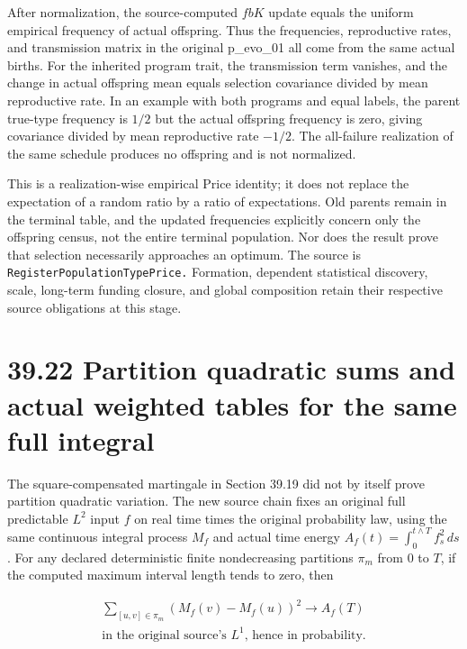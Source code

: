 \documentclass[
  english,
  11pt,
  oneside]{book}
\begin{document}
After normalization, the source-computed \(f bK\) update equals the uniform empirical frequency of actual offspring. Thus the frequencies, reproductive rates, and transmission matrix in the original p\_evo\_01 all come from the same actual births. For the inherited program trait, the transmission term vanishes, and the change in actual offspring mean equals selection covariance divided by mean reproductive rate. In an example with both programs and equal labels, the parent true-type frequency is \(1/2\) but the actual offspring frequency is zero, giving covariance divided by mean reproductive rate \(-1/2\). The all-failure realization of the same schedule produces no offspring and is not normalized.

This is a realization-wise empirical Price identity; it does not replace the expectation of a random ratio by a ratio of expectations. Old parents remain in the terminal table, and the updated frequencies explicitly concern only the offspring census, not the entire terminal population. Nor does the result prove that selection necessarily approaches an optimum. The source is \nolinkurl{RegisterPopulationTypePrice.} Formation, dependent statistical discovery, scale, long-term funding closure, and global composition retain their respective source obligations at this stage.

\section{39.22 Partition quadratic sums and actual weighted tables for the same full integral}\label{partition-quadratic-sums-and-actual-weighted-tables-for-the-same-full-integral}

The square-compensated martingale in Section 39.19 did not by itself prove partition quadratic variation. The new source chain fixes an original full predictable \(L^2\) input \(f\) on real time times the original probability law, using the same continuous integral process \(M_f\) and actual time energy \(A_f(t)=\int_0^{t\wedge T}f_s^2\,ds\). For any declared deterministic finite nondecreasing partitions \(\pi_m\) from \(0\) to \(T\), if the computed maximum interval length tends to zero, then

\[\begin{gathered}\sum_{[u,v]\in\pi_m}(M_f(v)-M_f(u))^2\longrightarrow A_f(T)
\\\text{in the original source's }L^1\text{, hence in probability.}\end{gathered}\]
\end{document}
